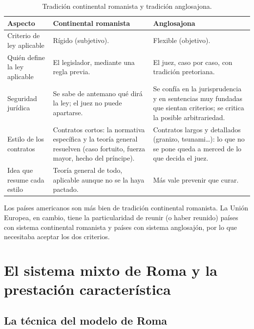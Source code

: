 \documentclass[12pt,oneside]{book}
\begin{document}
\begin{table}[H]
\centering
\small
\caption{Tradición continental romanista y tradición anglosajona.}
\begin{tabularx}{\textwidth}{>{\raggedright\arraybackslash}p{} Y Y}
\toprule
\textbf{Aspecto} & \textbf{Continental romanista} & \textbf{Anglosajona} \\
\midrule
Criterio de ley aplicable & Rígido (subjetivo). & Flexible (objetivo). \\
Quién define la ley aplicable & El legislador, mediante una regla previa. & El juez, caso por caso, con tradición pretoriana. \\
Seguridad jurídica & Se sabe de antemano qué dirá la ley; el juez no puede apartarse. & Se confía en la jurisprudencia y en sentencias muy fundadas que sientan criterios; se critica la posible arbitrariedad. \\
Estilo de los contratos & Contratos cortos: la normativa específica y la teoría general resuelven (caso fortuito, fuerza mayor, hecho del príncipe). & Contratos largos y detallados (granizo, tsunami\ldots): lo que no se pone queda a merced de lo que decida el juez. \\
Idea que resume cada estilo & Teoría general de todo, aplicable aunque no se la haya pactado. & Más vale prevenir que curar. \\
\bottomrule
\end{tabularx}
\end{table}

Los países americanos son más bien de tradición continental romanista. La Unión Europea, en cambio, tiene la particularidad de reunir (o haber reunido) países con sistema continental romanista y países con sistema anglosajón, por lo que necesitaba aceptar los dos criterios.


\section{El sistema mixto de Roma y la prestación característica}

\subsection{La técnica del modelo de Roma}
\end{document}
